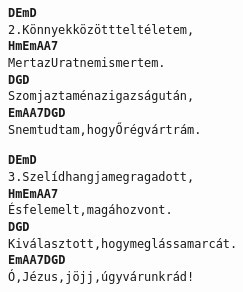\newpage
{}
\kottastart
{}
\kottaend
\begin{minipage}{\textwidth}
\begin{multicols}{2}
\begin{minipage}{\textwidth}
\begin{alltt}
\textbf{    D              Em      D}
2. Könnyek között telt életem,
\textbf{             Hm Em          A A7}
   Mert az Urat   nem ismertem.
\textbf{              D G             D}
   Szomjaztam én az igazság után,
\textbf{      Em          A A7            D G D}
   S nem tudtam, hogy Ő rég várt rám.
\end{alltt}
\vspace{0.0cm}
\versszakspacing
\end{minipage}
\begin{minipage}{\textwidth}
\begin{alltt}
\textbf{     D          Em        D}
3. Szelíd hangja  megragadott,
\textbf{           Hm  Em         A  A7}
   És felemelt,  magához vont.
\textbf{            D   G                  D}
   Kiválasztott, hogy meglássam arcát.
\textbf{   Em         A  A7            D G D}
   Ó, Jézus, jöjj, úgy várunk rád!
\end{alltt}
\vspace{0.0cm}
\versszakspacing
\end{minipage}
\vspace{0.2cm}
\end{multicols}
\end{minipage}

